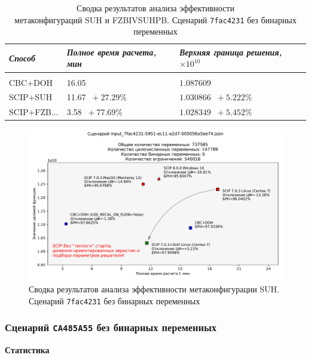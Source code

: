 \documentclass[%
	11pt,
	a4paper,
	utf8,
		]{article}
\begin{document}
{
	\begin{table}[!h]
		\centering
		\caption{Сводка результатов анализа эффективности \\метаконфигураций SUH и FZBIVSUHPB. Сценарий \texttt{7fac4231} без бинарных переменных}
		\begin{tabular}{ p{2.5cm} p{3.3cm} p{3.4cm} }
			\emph{Способ} & \emph{Полное время расчета, мин} & \emph{Верхняя граница решения, $ \times 10^{10} $} \\
			\hline\hline\\[-3.5mm]
			{CBC+DOH} & 16.05 & $ 1.087609 $ \\
			\hline
			SCIP+SUH & 11.67 {\color{blue} $\ +27.29 $\%} & $ 1.030866 $ {\color{blue} $\ +5.222 $\%} \\
			\hline
			SCIP+FZB... & 3.58 {\color{blue} $\ +77.69 $\%} & $ 1.028349 $ {\color{blue} $\ +5.452 $\%} \\
		\end{tabular}\label{tab:7fac4231_wo_bins}
	\end{table}
}

\begin{figure}[!h]
	\centering
	\includegraphics[scale=0.6]{figures/summary_7fac4231.pdf}
	\caption{Сводка результатов анализа эффективности метаконфигурации SUH. \\Сценарий \texttt{7fac4231} без бинарных переменных}\label{fig:summary_7fac4231}
\end{figure}

\subsubsection{Сценарий \texttt{CA485A55} без бинарных переменных}

\textbf{Статистика}\vspace*{1mm}
\end{document}
